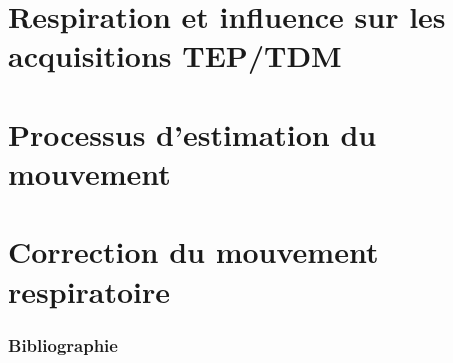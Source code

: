 \documentclass[12pt]{article}
\begin{document}
\newpage
\part{Respiration et influence sur les acquisitions TEP/TDM}


\newpage
\part{Processus d'estimation du mouvement}


\newpage
\part{Correction du mouvement respiratoire}


\newpage
\section{Bibliographie}


\end{document}
